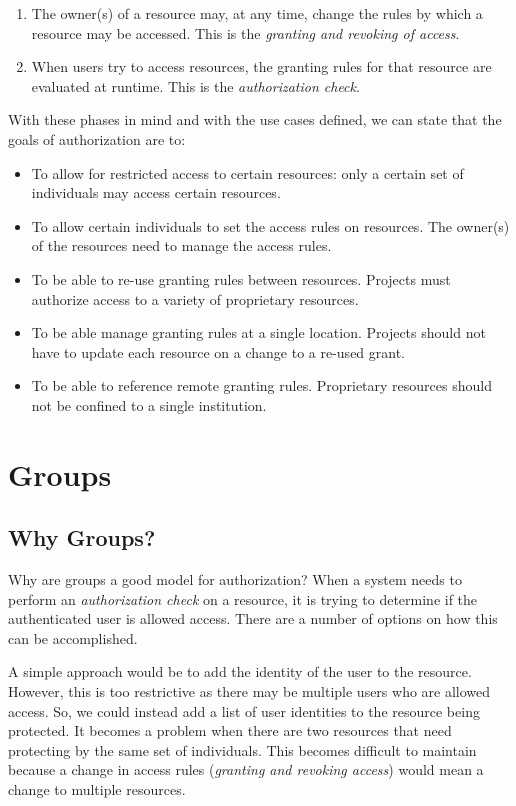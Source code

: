 \documentclass[11pt,a4paper]{ivoa}
\begin{document}
\begin{enumerate}
\item The owner(s) of a resource may, at any time, change the rules by which a resource may be accessed. This is the \emph{granting and revoking of access}.
\item When users try to access resources, the granting rules for that resource are evaluated at runtime. This is the \emph{authorization check}.
\end{enumerate}

With these phases in mind and with the use cases defined, we can state that the goals of authorization are to:

\begin{itemize}
\item To allow for restricted access to certain resources: only a certain set of individuals may access certain resources.
\item To allow certain individuals to set the access rules on resources.  The owner(s) of the resources need to manage the access rules.
\item To be able to re-use granting rules between resources.  Projects must authorize access to a variety of proprietary resources.
\item To be able manage granting rules at a single location.  Projects should not have to update each resource on a change to a re-used grant.
\item To be able to reference remote granting rules.  Proprietary resources should not be confined to a single institution.
\end{itemize}

\section{Groups}

\subsection{Why Groups?}

Why are groups a good model for authorization?  When a system needs to perform an \emph{authorization check} on a resource, it is trying to determine if the authenticated user is allowed access.  There are a number of options on how this can be accomplished.

A simple approach would be to add the identity of the user to the resource.  However, this is too restrictive as there may be multiple users who are allowed access.  So, we could instead add a list of user identities to the resource being protected.  It becomes a problem when there are two resources that need protecting by the same set of individuals.  This becomes difficult to maintain because a change in access rules (\emph{granting and revoking access}) would mean a change to multiple resources.
\end{document}
